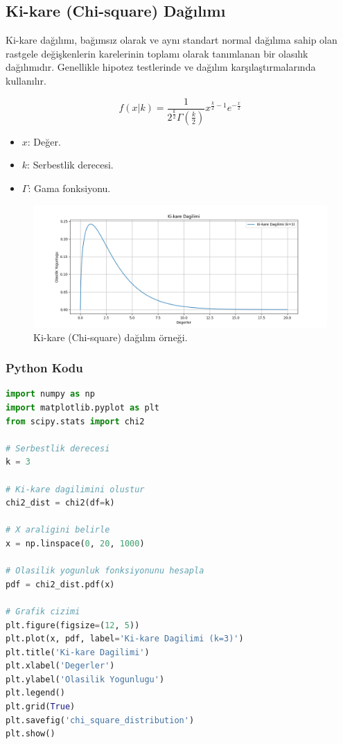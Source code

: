 \newpage

\subsection{Ki-kare (Chi-square) Dağılımı}
Ki-kare dağılımı, bağımsız olarak ve aynı standart normal dağılıma sahip olan rastgele değişkenlerin karelerinin toplamı olarak tanımlanan bir olasılık dağılımıdır. Genellikle hipotez testlerinde ve dağılım karşılaştırmalarında kullanılır.

\[f(x|k) = \frac{1}{2^{\frac{k}{2}} \Gamma\left(\frac{k}{2}\right)} x^{\frac{k}{2} - 1} e^{-\frac{x}{2}}\]
\begin{itemize}
	\item $x$: Değer.
	\item $k$: Serbestlik derecesi.
	\item $\Gamma$: Gama fonksiyonu.
\end{itemize}

\begin{figure}[h]
    \centering
    \includegraphics[width=1\textwidth]{images/chi_square_distribution.png}
    \caption{Ki-kare (Chi-square) dağılım örneği.}
    \label{fig:enter-label}
\end{figure}

\subsubsection{Python Kodu}

\begin{lstlisting}[language=Python]
import numpy as np
import matplotlib.pyplot as plt
from scipy.stats import chi2

# Serbestlik derecesi
k = 3

# Ki-kare dagilimini olustur
chi2_dist = chi2(df=k)

# X araligini belirle
x = np.linspace(0, 20, 1000)

# Olasilik yogunluk fonksiyonunu hesapla
pdf = chi2_dist.pdf(x)

# Grafik cizimi
plt.figure(figsize=(12, 5))
plt.plot(x, pdf, label='Ki-kare Dagilimi (k=3)')
plt.title('Ki-kare Dagilimi')
plt.xlabel('Degerler')
plt.ylabel('Olasilik Yogunlugu')
plt.legend()
plt.grid(True)
plt.savefig('chi_square_distribution')
plt.show()
\end{lstlisting}

